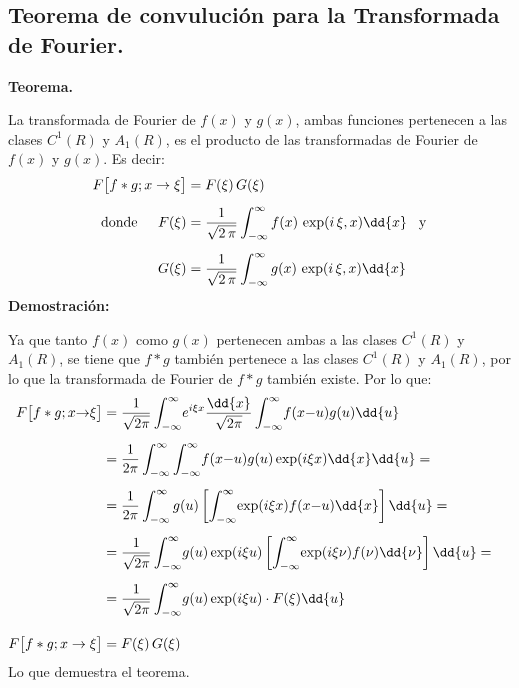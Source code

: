 \subsection{Teorema de convulución para la Transformada de Fourier.}

\textbf{Teorema.}

La transformada de Fourier de $f(x)$ y $g(x)$, ambas funciones pertenecen a las clases $C^{1}(R)$ y $A_{1}(R)$, es el producto de las transformadas de Fourier de $f(x)$ y $g(x)$. Es decir:
\begin{align*}
F \big[f * g; x \to \xi \big] &= F(\xi) \, G(\xi) \\[0.5em]
\mbox{donde } \hspace{0.4cm} F(\xi) &= \dfrac{1}{\sqrt{2 \, \pi}} \int_{-\infty}^{\infty} f(x) \, \exp(i \, \xi, x) \dd{x} \hspace{0.3cm} \mbox{y} \\[0.5em]
G(\xi) &= \dfrac{1}{\sqrt{2 \, \pi}} \int_{-\infty}^{\infty} g(x) \, \exp(i \, \xi, x) \dd{x}
\end{align*}
\textbf{Demostración: }

Ya que tanto $f(x)$ como $g(x)$ pertenecen ambas a las clases $C^{1}(R)$ y $A_{1}(R)$, se tiene que $f * g$ también pertenece a las clases $C^{1}(R)$ y $A_{1}(R)$, por lo que la transformada de Fourier de $f * g$ también existe. Por lo que:
\begin{align}
\hspace*{-0.5cm}
\begin{aligned}[b]
F \big[f * g; x {\to} \xi \big] &= \dfrac{1}{\sqrt{2 \pi}} \int_{-\infty}^{\infty} \! e^{i  \xi x} \dfrac{\dd{x}}{\sqrt{2 \pi}} \int_{-\infty}^{\infty} \! f(x {-} u) g(u) \dd{u} \\[0.5em]
&= \dfrac{1}{2 \pi} \int_{-\infty}^{\infty} \int_{-\infty}^{\infty} \! f(x {-} u) g(u) \exp(i \xi x) \dd{x} \dd{u} = \\[0.5em]
&= \dfrac{1}{2 \pi} \int_{-\infty}^{\infty} g(u) \left[ \int_{-\infty}^{\infty} \! \exp(i \xi x) f(x {-} u) \dd{x} \right] \dd{u} = \\[0.5em]
&= \dfrac{1}{\sqrt{2  \pi}} \int_{-\infty}^{\infty} \! g(u) \exp(i \xi u) \left[ \int_{-\infty}^{\infty} \! \exp(i \xi \nu) f(\nu) \dd{\nu} \right] \dd{u} = \\[0.5em]
&= \dfrac{1}{\sqrt{2 \pi}} \int_{-\infty}^{\infty} \! g(u) \exp(i  \xi u) \cdot F(\xi) \dd{u} \\[1em]
F \big[f * g; x \to \xi \big] &= F(\xi) \, G(\xi)
\end{aligned}
\label{eq:ecuacion_01_24}
\end{align}
Lo que demuestra el teorema.
\\
\bigskip

